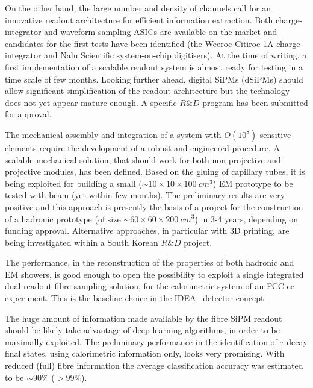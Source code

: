 On the other hand, the large number and density of channels call for an innovative readout architecture for efficient information extraction. Both charge-integrator and waveform-sampling ASICs are available on the market and candidates for the first tests have been identified (the Weeroc Citiroc 1A charge integrator and Nalu Scientific system-on-chip digitisers). At the time of writing, a first implementation of a scalable readout system is almost ready for testing in a time scale of few months.
Looking further ahead, digital SiPMs (dSiPMs) should allow significant simplification of the readout architecture but the technology does not yet appear mature enough. A specific $R\&D$ program has been submitted for approval.

The mechanical assembly and integration of a system with $O(10^8)$ sensitive elements require the development of a robust and engineered procedure.
A scalable mechanical solution, that should work for both non-projective and projective modules, has been defined. Based on the gluing of capillary tubes, it is being exploited for building a small ($\sim 10 \times 10 \times 100\ cm^3$) EM prototype to be tested with beam (yet within few months). The preliminary results are very positive and this approach is presently the basis of a project for the construction of a hadronic prototype (of size $\sim 60 \times 60 \times 200\ cm^3$) in 3-4 years, depending on funding approval. Alternative approaches, in particular with 3D printing, are being investigated within a South Korean $R\&D$ project.

The performance, in the reconstruction of the properties of both hadronic and EM showers, is good enough to open the possibility to exploit a single integrated dual-readout fibre-sampling solution, for the calorimetric system of an FCC-ee experiment. This is the baseline choice in the IDEA~\cite{IDEA_tb1} detector concept. 

The huge amount of information made available by the fibre SiPM readout should be likely take advantage of deep-learning algorithms, in order to be maximally exploited. The preliminary performance in the identification of $\tau$-decay final states, using calorimetric information only, looks very promising. With reduced (full) fibre information the average classification accuracy was estimated to be $\sim 90\%$ ($> 99\%$).